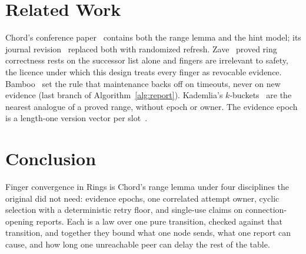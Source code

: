 \documentclass[journal]{IEEEtran}
\begin{document}
\section{Related Work}\label{sec:related}

Chord's conference paper~\cite{Stoica2001} contains both the range lemma
and the hint model; its journal revision~\cite{Stoica2003} replaced both
with randomized refresh.  Zave~\cite{Zave2015,Zave2017} proved ring
correctness rests on the successor list alone and fingers are irrelevant
to safety, the licence under which this design treats every finger as
revocable evidence.  Bamboo~\cite{Rhea2004} set the rule that maintenance
backs off on timeouts, never on new evidence (last branch of
Algorithm~\ref{alg:report}).  Kademlia's $k$-buckets~\cite{Maymounkov2002}
are the nearest analogue of a proved range, without epoch or owner.  The
evidence epoch is a length-one version vector per slot~\cite{Fidge1988}.

\section{Conclusion}

Finger convergence in Rings is Chord's range lemma under four disciplines
the original did not need: evidence epochs, one correlated attempt owner,
cyclic selection with a deterministic retry floor, and single-use claims on
connection-opening reports.  Each is a law over one pure transition, checked
against that transition, and together they bound what one node sends, what
one report can cause, and how long one unreachable peer can delay the rest
of the table.



\end{document}
